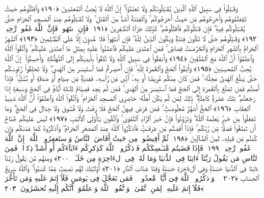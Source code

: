  وَقَـٰتِلُوا۟ فِى سَبِيلِ ٱللَّهِ ٱلَّذِينَ يُقَـٰتِلُونَكُم وَلَا تَعتَدُوٓا۟ ۚ إِنَّ ٱللَّهَ لَا يُحِبُّ ٱلمُعتَدِينَ ﴿١٩٠﴾
 وَٱقتُلُوهُم حَيثُ ثَقِفتُمُوهُم وَأَخرِجُوهُم مِّن حَيثُ أَخرَجُوكُم ۚ وَٱلفِتنَةُ أَشَدُّ مِنَ ٱلقَتلِ ۚ وَلَا تُقَـٰتِلُوهُم عِندَ ٱلمَسجِدِ ٱلحَرَامِ حَتَّىٰ يُقَـٰتِلُوكُم فِيهِ ۖ فَإِن قَـٰتَلُوكُم فَٱقتُلُوهُم ۗ كَذَٟلِكَ جَزَآءُ ٱلكَـٰفِرِينَ ﴿١٩١﴾
 فَإِنِ ٱنتَهَوا۟ فَإِنَّ ٱللَّهَ غَفُورٌۭ رَّحِيمٌۭ ﴿١٩٢﴾
 وَقَـٰتِلُوهُم حَتَّىٰ لَا تَكُونَ فِتنَةٌۭ وَيَكُونَ ٱلدِّينُ لِلَّهِ ۖ فَإِنِ ٱنتَهَوا۟ فَلَا عُدوَٟنَ إِلَّا عَلَى ٱلظَّـٰلِمِينَ ﴿١٩٣﴾
 ٱلشَّهرُ ٱلحَرَامُ بِٱلشَّهرِ ٱلحَرَامِ وَٱلحُرُمَـٰتُ قِصَاصٌۭ ۚ فَمَنِ ٱعتَدَىٰ عَلَيكُم فَٱعتَدُوا۟ عَلَيهِ بِمِثلِ مَا ٱعتَدَىٰ عَلَيكُم ۚ وَٱتَّقُوا۟ ٱللَّهَ وَٱعلَمُوٓا۟ أَنَّ ٱللَّهَ مَعَ ٱلمُتَّقِينَ ﴿١٩٤﴾
 وَأَنفِقُوا۟ فِى سَبِيلِ ٱللَّهِ وَلَا تُلقُوا۟ بِأَيدِيكُم إِلَى ٱلتَّهلُكَةِ ۛ وَأَحسِنُوٓا۟ ۛ إِنَّ ٱللَّهَ يُحِبُّ ٱلمُحسِنِينَ ﴿١٩٥﴾
 وَأَتِمُّوا۟ ٱلحَجَّ وَٱلعُمرَةَ لِلَّهِ ۚ فَإِن أُحصِرتُم فَمَا ٱستَيسَرَ مِنَ ٱلهَدىِ ۖ وَلَا تَحلِقُوا۟ رُءُوسَكُم حَتَّىٰ يَبلُغَ ٱلهَدىُ مَحِلَّهُۥ ۚ فَمَن كَانَ مِنكُم مَّرِيضًا أَو بِهِۦٓ أَذًۭى مِّن رَّأسِهِۦ فَفِديَةٌۭ مِّن صِيَامٍ أَو صَدَقَةٍ أَو نُسُكٍۢ ۚ فَإِذَآ أَمِنتُم فَمَن تَمَتَّعَ بِٱلعُمرَةِ إِلَى ٱلحَجِّ فَمَا ٱستَيسَرَ مِنَ ٱلهَدىِ ۚ فَمَن لَّم يَجِد فَصِيَامُ ثَلَـٰثَةِ أَيَّامٍۢ فِى ٱلحَجِّ وَسَبعَةٍ إِذَا رَجَعتُم ۗ تِلكَ عَشَرَةٌۭ كَامِلَةٌۭ ۗ ذَٟلِكَ لِمَن لَّم يَكُن أَهلُهُۥ حَاضِرِى ٱلمَسجِدِ ٱلحَرَامِ ۚ وَٱتَّقُوا۟ ٱللَّهَ وَٱعلَمُوٓا۟ أَنَّ ٱللَّهَ شَدِيدُ ٱلعِقَابِ ﴿١٩٦﴾
 ٱلحَجُّ أَشهُرٌۭ مَّعلُومَـٰتٌۭ ۚ فَمَن فَرَضَ فِيهِنَّ ٱلحَجَّ فَلَا رَفَثَ وَلَا فُسُوقَ وَلَا جِدَالَ فِى ٱلحَجِّ ۗ وَمَا تَفعَلُوا۟ مِن خَيرٍۢ يَعلَمهُ ٱللَّهُ ۗ وَتَزَوَّدُوا۟ فَإِنَّ خَيرَ ٱلزَّادِ ٱلتَّقوَىٰ ۚ وَٱتَّقُونِ يَـٰٓأُو۟لِى ٱلأَلبَٰبِ ﴿١٩٧﴾
 لَيسَ عَلَيكُم جُنَاحٌ أَن تَبتَغُوا۟ فَضلًۭا مِّن رَّبِّكُم ۚ فَإِذَآ أَفَضتُم مِّن عَرَفَـٰتٍۢ فَٱذكُرُوا۟ ٱللَّهَ عِندَ ٱلمَشعَرِ ٱلحَرَامِ ۖ وَٱذكُرُوهُ كَمَا هَدَىٰكُم وَإِن كُنتُم مِّن قَبلِهِۦ لَمِنَ ٱلضَّآلِّينَ ﴿١٩٨﴾
 ثُمَّ أَفِيضُوا۟ مِن حَيثُ أَفَاضَ ٱلنَّاسُ وَٱستَغفِرُوا۟ ٱللَّهَ ۚ إِنَّ ٱللَّهَ غَفُورٌۭ رَّحِيمٌۭ ﴿١٩٩﴾
 فَإِذَا قَضَيتُم مَّنَـٰسِكَكُم فَٱذكُرُوا۟ ٱللَّهَ كَذِكرِكُم ءَابَآءَكُم أَو أَشَدَّ ذِكرًۭا ۗ فَمِنَ ٱلنَّاسِ مَن يَقُولُ رَبَّنَآ ءَاتِنَا فِى ٱلدُّنيَا وَمَا لَهُۥ فِى ٱلءَاخِرَةِ مِن خَلَـٰقٍۢ ﴿٢٠٠﴾
 وَمِنهُم مَّن يَقُولُ رَبَّنَآ ءَاتِنَا فِى ٱلدُّنيَا حَسَنَةًۭ وَفِى ٱلءَاخِرَةِ حَسَنَةًۭ وَقِنَا عَذَابَ ٱلنَّارِ ﴿٢٠١﴾
 أُو۟لَـٰٓئِكَ لَهُم نَصِيبٌۭ مِّمَّا كَسَبُوا۟ ۚ وَٱللَّهُ سَرِيعُ ٱلحِسَابِ ﴿٢٠٢﴾
 ۞ وَٱذكُرُوا۟ ٱللَّهَ فِىٓ أَيَّامٍۢ مَّعدُودَٟتٍۢ ۚ فَمَن تَعَجَّلَ فِى يَومَينِ فَلَآ إِثمَ عَلَيهِ وَمَن تَأَخَّرَ فَلَآ إِثمَ عَلَيهِ ۚ لِمَنِ ٱتَّقَىٰ ۗ وَٱتَّقُوا۟ ٱللَّهَ وَٱعلَمُوٓا۟ أَنَّكُم إِلَيهِ تُحشَرُونَ ﴿٢٠٣﴾
